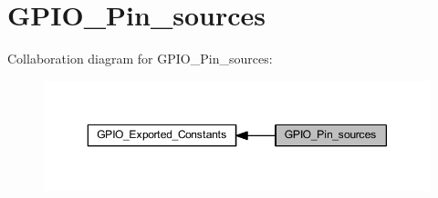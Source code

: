 \hypertarget{group___g_p_i_o___pin__sources}{}\section{G\+P\+I\+O\+\_\+\+Pin\+\_\+sources}
\label{group___g_p_i_o___pin__sources}
Collaboration diagram for G\+P\+I\+O\+\_\+\+Pin\+\_\+sources\+:\nopagebreak
\begin{figure}[H]
\begin{center}
\leavevmode
\includegraphics[width=350pt]{group___g_p_i_o___pin__sources}
\end{center}
\end{figure}
